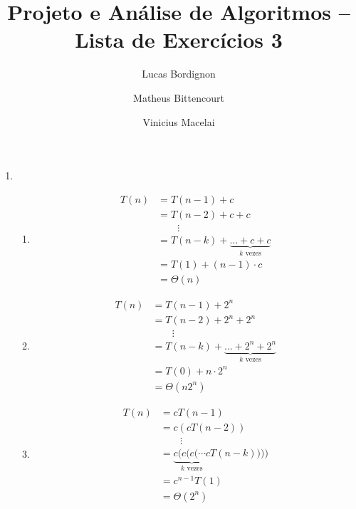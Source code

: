 \documentclass{article}
\title{Projeto e Análise de Algoritmos -- Lista de Exercícios 3}
\author{Lucas Bordignon \and Matheus Bittencourt \and Vinicius Macelai}
\date{}
\begin{document}
\maketitle

\begin{enumerate}
	\item \begin{enumerate}

		\item \begin{align*}
			T(n) &= T(n-1) + c \\
			&= T(n-2) + c + c \\
			&\qquad\vdots \\
			&= T(n-k) + \underbrace{\ldots + c + c}_{\text{$k$ vezes}} \\
			&= T(1) + (n-1)\cdot c \\
			&= \Theta(n)
		\end{align*}

		\item \begin{align*}
			T(n) &= T(n-1) + 2^n \\
			&= T(n-2) + 2^n + 2^n \\
			&\qquad\vdots \\
			&= T(n-k) + \underbrace{\ldots+2^n+2^n}_{\text{$k$ vezes}} \\
			&= T(0) + n\cdot2^n \\
			&= \Theta(n2^n)
		\end{align*}

		\item \begin{align*}
			T(n) &= cT(n-1) \\
			&= c(cT(n-2)) \\
			&\qquad\vdots \\
			&= \underbrace{c(c(c(\cdots c}_{\text{$k$ vezes}}T(n-k)))) \\
			&= c^{n-1}T(1) \\
			&= \Theta(2^n)
		\end{align*}


\end{enumerate}
\end{enumerate}
\end{document}
